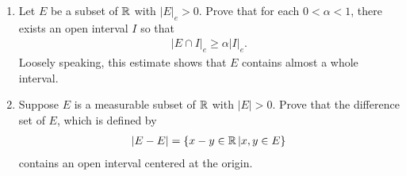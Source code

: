 \documentclass[UTF8,a4paper,10pt]{article}
\begin{document}
  \begin{Problem}[]{
    }
    \begin{enumerate}[label=(\alph*)]
      \item Let \(E\) be a subset of \(\operatorname{\mathbb{R}}\) with \(|E|_e > 0\). Prove that for each \(0 < \alpha < 1\), there
      exists an open interval \(I\) so that
      \begin{equation*}
        \begin{aligned}
          |E \cap I|_e \geq \alpha |I|_e.
        \end{aligned}
      \end{equation*}
      Loosely speaking, this estimate shows that \(E\) contains almost a whole interval.
      \item Suppose \(E\) is a measurable subset of \(\operatorname{\mathbb{R}}\) with \(|E| > 0\). Prove that the difference set of \(E\), which is defined by      
      \begin{equation*}
        \begin{aligned}
          |E - E| = \{x-y\in\operatorname{\mathbb{R}}|x,y\in E\}
        \end{aligned}
      \end{equation*}
      contains an open interval centered at the origin.
    \end{enumerate}

  \end{Problem}


  \begin{solution}\,



  \end{solution}
\end{document}
